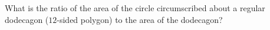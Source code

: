 What is the ratio of the area of the circle circumscribed about a regular dodecagon ($12$-sided polygon) to the area of the dodecagon?
